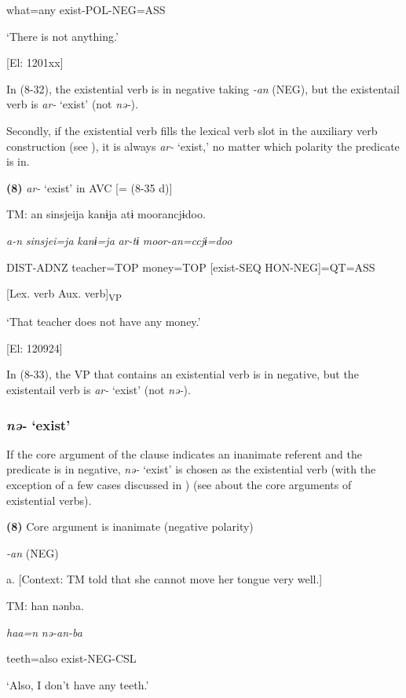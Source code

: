     what=any  exist-POL-NEG=ASS

    ‘There is not anything.’

    [El: 1201xx]

In (8-32), the existential verb is in negative taking \textit{{}-an} (NEG), but the existentail verb is \textit{ar-} ‘exist’ (not \textit{nə-}).

  Secondly, if the existential verb fills the lexical verb slot in the auxiliary verb construction (see ), it is always \textit{ar-} ‘exist,’ no matter which polarity the predicate is in.

\textbf{(8)}  \textit{ar-} ‘exist’ in AVC [= (8-35 d)]

  TM:  an  sinsjeija  kanɨja  atɨ  moorancjɨdoo.

    \textit{a-n}  \textit{sinsjei=ja}  \textit{kanɨ=ja}  \textit{ar-tɨ}  \textit{moor-an=ccjɨ=doo}

    DIST-ADNZ  teacher=TOP  money=TOP  [exist-SEQ  HON-NEG]=QT=ASS

          [Lex. verb  Aux. verb]\textsubscript{VP}

    ‘That teacher does not have any money.’

    [El: 120924]

In (8-33), the VP that contains an existential verb is in negative, but the existentail verb is \textit{ar-} ‘exist’ (not \textit{nə-}).

\subsubsection{\textit{nə-} ‘exist’}

If the core argument of the clause indicates an inanimate referent and the predicate is in negative, \textit{nə-} ‘exist’ is chosen as the existential verb (with the exception of a few cases discussed in ) (see  about the core arguments of existential verbs).

\textbf{(8)}  Core argument is inanimate (negative polarity)

  \textit{{}-an} (NEG)

  a.  [Context: TM told that she cannot move her tongue very well.]

    TM:  han  nənba.

      \textit{haa=n}  \textit{nə-an{}-ba}

      teeth=also  exist-NEG-CSL

      ‘Also, I don’t have any teeth.’

